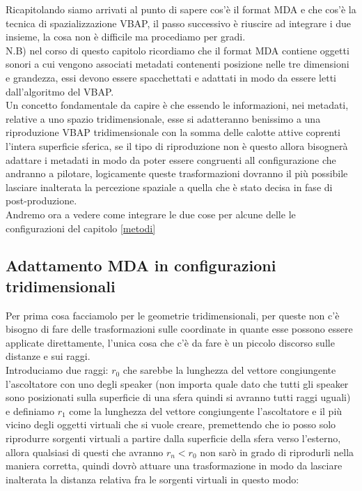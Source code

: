 \documentclass[12pt,a4paper]{report}
\begin{document}
Ricapitolando siamo arrivati al punto di sapere cos'è il format MDA e che cos'è la tecnica di spazializzazione VBAP,
il passo successivo è riuscire ad integrare i due insieme, la cosa non è difficile ma procediamo per gradi.\\

N.B) nel corso di questo capitolo
ricordiamo che il format MDA contiene oggetti sonori a cui vengono associati metadati contenenti posizione nelle tre dimensioni e grandezza, essi devono essere spacchettati e adattati in modo da essere letti dall'algoritmo del VBAP.\\

Un concetto fondamentale da capire è che essendo le informazioni, nei metadati, relative a uno spazio tridimensionale, esse si adatteranno benissimo a una riproduzione VBAP tridimensionale con la somma delle calotte attive coprenti l'intera superficie sferica, se il tipo di riproduzione non è questo allora bisognerà adattare i metadati in modo da poter essere congruenti all configurazione che andranno a pilotare, logicamente queste trasformazioni dovranno il più possibile lasciare inalterata la percezione spaziale a quella che è stato decisa in fase di post-produzione.\\

Andremo ora a vedere come integrare le due cose per alcune delle le configurazioni del capitolo \ref{metodi}

\subsection{Adattamento MDA in configurazioni tridimensionali}

Per prima cosa facciamolo per le geometrie tridimensionali, per queste non c'è bisogno di fare delle trasformazioni sulle coordinate in quante esse possono essere applicate direttamente, l'unica cosa che c'è da fare è un piccolo discorso sulle distanze e sui raggi.\\

Introduciamo due raggi: $r_0$ che sarebbe la lunghezza del vettore congiungente l'ascoltatore con uno degli speaker (non importa quale dato che tutti gli speaker sono posizionati sulla superficie di una sfera quindi si avranno tutti raggi uguali) e definiamo $r_1$ come la lunghezza del vettore congiungente l'ascoltatore e il più vicino degli oggetti virtuali che si vuole creare, premettendo che io posso solo riprodurre sorgenti virtuali a partire dalla superficie della sfera verso l'esterno, allora qualsiasi di questi che avranno $r_n < r_0$ non sarò in grado di riprodurli nella maniera corretta, quindi dovrò attuare una trasformazione in modo da lasciare inalterata la distanza relativa fra le sorgenti virtuali in questo modo:
\end{document}
